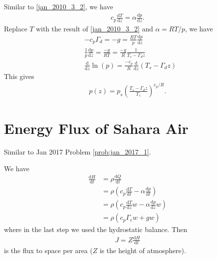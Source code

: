 \documentclass[11pt,letterpaper]{book}
\theoremstyle{definition}
\newcommand{\de}{\mathrm{d}}
\begin{document}
\subsection{}
Similar to \ref{jan_2010_3_2}, we have
\begin{align*}
c_p\frac{\de T}{\de z} = \alpha\frac{\de p}{\de z}.
\end{align*}
Replace $T$ with the result of \ref{jan_2010_3_2} and $\alpha = RT/p$, we have
\begin{align*}
&-c_p\Gamma_d = -g = \frac{RT}{p} \frac{\de p}{\de z}\\
&\frac{1}{p}\frac{\de p}{\de z} = \frac{-g}{RT} = \frac{-g}{R}\frac{1}{T_s-\Gamma_dz}\\
&\frac{\de}{\de z}\ln(p) = \frac{-c_p}{R}\frac{\de}{\de z}(T_s-\Gamma_d z)
\end{align*}
This gives
\begin{align*}
p(z) = p_s\left(\frac{T_s-\Gamma_d z}{T_s}\right)^{c_p/R}.
\end{align*}

\section{Energy Flux of Sahara Air}\label{Jan_2010_4}
Similar to Jan 2017 Problem \ref{prob:jan_2017_1}.

We have
\begin{align*}
\frac{\de H}{\de t} &= \rho\frac{\de Q}{\de t} \\
&= \rho\left(c_p\frac{\de T}{\de t}-\alpha\frac{\de p}{\de t}\right)\\
&= \rho\left(c_p\frac{\de T}{\de z}w-\alpha\frac{\de p}{\de z}w\right)\\
&= \rho\left(c_p\Gamma_e w+gw\right)
\end{align*}
where in the last step we used the hydrostatic balance. Then 
\begin{align*}
    J = Z\frac{\de H}{\de t}
\end{align*}
is the flux to space per area ($Z$ is the height of atmosphere).
\end{document}
